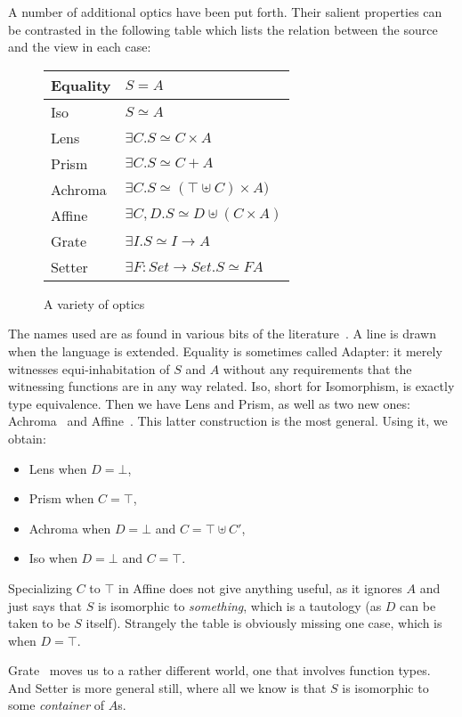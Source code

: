 \documentclass[sigplan,review,anonymous]{acmart}
\begin{document}
A number of additional optics have been put forth. Their salient
properties can be contrasted in the following table which lists
the relation between the source and the view in each case:

\medskip
\begin{figure}[h]
\begin{center}\begin{tabular}{ll}\hline
Equality & $S = A$ \\ \hline
Iso & $S ≃ A$ \\ \hline
Lens & $∃C. S ≃ C × A$ \\
Prism & $∃C . S ≃ C + A$ \\
Achroma & $∃C. S ≃ (⊤ ⊎ C) × A)$ \\
Affine & $∃C, D. S ≃ D ⊎ (C × A)$ \\ \hline
Grate & $∃I. S ≃ I → A$ \\ \hline
Setter & $∃ F : \mathit{Set} → \mathit{Set}. S ≃ F A$ \\ \hline
\end{tabular}\end{center}
\caption{A variety of optics}
\label{fig:optics}
\end{figure}

The names used are as found in various bits of the
literature~\cite{oleg-blog,achromatic,affine,grate}. A line is drawn
when the language is extended.  Equality is sometimes called Adapter:
it merely witnesses equi-inhabitation of $S$ and $A$ without any
requirements that the witnessing functions are in any way
related. Iso, short for Isomorphism, is exactly type equivalence.
Then we have Lens and Prism, as well as two new ones:
Achroma~\cite{achromatic} and Affine~\cite{affine}. This latter
construction is the most general. Using it, we obtain:
\begin{itemize}
\item Lens when $D = ⊥$,
\item Prism when $C = ⊤$,
\item Achroma when $D = ⊥$ and $C = ⊤ ⊎ C′$,
\item Iso when $D = ⊥$ and $C = ⊤$.
\end{itemize}
Specializing $C$ to $⊤$ in Affine does not give anything useful, as it
ignores $A$ and just says that $S$ is isomorphic to \emph{something},
which is a tautology (as $D$ can be taken to be $S$ itself). Strangely
the table is obviously missing one case, which is when
$D = ⊤$.

Grate~\cite{grate} moves us to a rather different world, one that
involves function types. And Setter is more general still, where all
we know is that $S$ is isomorphic to some \emph{container} of $A$s.
\end{document}
